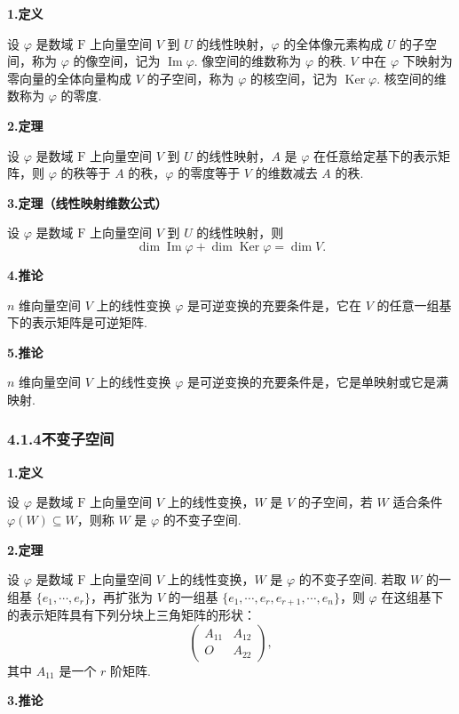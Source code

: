 \documentclass[UTF8, 12pt, fontset=fandol, oneside]{ctexart}
\begin{document}
\noindent\textbf{1.\quad 定义}

设 $\varphi$ 是数域 $\mathrm{F}$ 上向量空间 $V$ 到 $U$ 的线性映射，$\varphi$ 的全体像元素构成 $U$ 的子空间，称为 $\varphi$ 的像空间，记为 $\operatorname{Im}\varphi$. 像空间的维数称为 $\varphi$ 的秩. $V$ 中在 $\varphi$ 下映射为零向量的全体向量构成 $V$ 的子空间，称为 $\varphi$ 的核空间，记为 $\operatorname{Ker}\varphi$. 核空间的维数称为 $\varphi$ 的零度.

\noindent\textbf{2.\quad 定理}

设 $\varphi$ 是数域 $\mathrm{F}$ 上向量空间 $V$ 到 $U$ 的线性映射，$A$ 是 $\varphi$ 在任意给定基下的表示矩阵，则 $\varphi$ 的秩等于 $A$ 的秩，$\varphi$ 的零度等于 $V$ 的维数减去 $A$ 的秩.

\noindent\textbf{3.\quad 定理（线性映射维数公式）}

设 $\varphi$ 是数域 $\mathrm{F}$ 上向量空间 $V$ 到 $U$ 的线性映射，则
\[
\dim\operatorname{Im}\varphi+\dim\operatorname{Ker}\varphi=\dim V.
\]

\noindent\textbf{4.\quad 推论}

$n$ 维向量空间 $V$ 上的线性变换 $\varphi$ 是可逆变换的充要条件是，它在 $V$ 的任意一组基下的表示矩阵是可逆矩阵.

\noindent\textbf{5.\quad 推论}

$n$ 维向量空间 $V$ 上的线性变换 $\varphi$ 是可逆变换的充要条件是，它是单映射或它是满映射.

\subsubsection*{4.1.4\quad 不变子空间}

\noindent\textbf{1.\quad 定义}

设 $\varphi$ 是数域 $\mathrm{F}$ 上向量空间 $V$ 上的线性变换，$W$ 是 $V$ 的子空间，若 $W$ 适合条件 $\varphi(W)\subseteq W$，则称 $W$ 是 $\varphi$ 的不变子空间.

\noindent\textbf{2.\quad 定理}

设 $\varphi$ 是数域 $\mathrm{F}$ 上向量空间 $V$ 上的线性变换，$W$ 是 $\varphi$ 的不变子空间. 若取 $W$ 的一组基 $\{e_1,\cdots,e_r\}$，再扩张为 $V$ 的一组基 $\{e_1,\cdots,e_r,e_{r+1},\cdots,e_n\}$，则 $\varphi$ 在这组基下的表示矩阵具有下列分块上三角矩阵的形状：
\[
\left(\begin{array}{cc}
A_{11} & A_{12}\\
O & A_{22}
\end{array}\right),
\]
其中 $A_{11}$ 是一个 $r$ 阶矩阵.

\noindent\textbf{3.\quad 推论}
\end{document}
